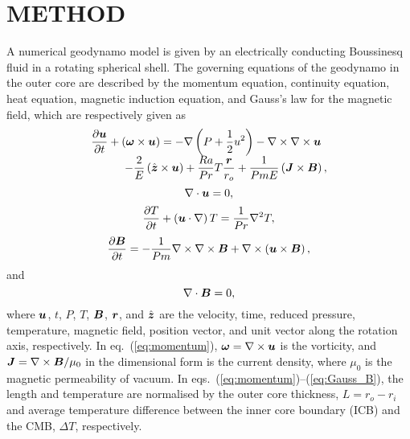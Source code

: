 \section{METHOD}

A numerical geodynamo model is given by an electrically conducting Boussinesq fluid in a rotating spherical shell. The governing equations of the geodynamo in the outer core are described by the momentum equation, continuity equation, heat equation, magnetic induction equation, and Gauss's law for the magnetic field, which are respectively given as
%
\begin{equation}
\begin{array}{l}
\displaystyle
\frac{\partial \mbox{\boldmath$u$}}{\partial t} + \left(\mbox{\boldmath$\omega$} \times \mbox{\boldmath$u$}\right)
 = - \nabla \left(P+\frac{1}{2}u^{2} \right) - \nabla \times \nabla \times \mbox{\boldmath$u$}
\\
\displaystyle
\hspace*{3em}
      - \frac{2}{E} \left(\hat{\mbox{\boldmath$z$}} \times \mbox{\boldmath$u$} \right)
  + \frac{Ra}{Pr} T \frac{\mbox{\boldmath$r$}}{r_{o}}
        + \frac{1}{Pm E} \left(\mbox{\boldmath$J$} \times \mbox{\boldmath$B$} \right),
\label{eq:momentum}
\end{array}
\end{equation}
%
\begin{equation}
\nabla \cdot \mbox{\boldmath$u$} = 0, 
\label{eq:conservation}
\end{equation}
%
\begin{equation}
\frac{\partial T}{\partial t} + \left(\mbox{\boldmath$u$} \cdot \nabla \right) T
 = \frac{1}{Pr} \nabla^{2} T,
\label{eq:heat}
\end{equation}
%
\begin{equation}
 \frac{\partial \mbox{\boldmath$B$}}{\partial t}
 = -\frac{1}{Pm}  \nabla \times \nabla \times \mbox{\boldmath$B$}
       + \nabla \times \left(\mbox{\boldmath$u$} \times \mbox{\boldmath$B$} \right),
\label{eq:induction}
\end{equation}
%
and
\begin{equation}
\nabla \cdot \mbox{\boldmath$B$} = 0,
\label{eq:Gauss_B}
\end{equation}
%
where $\mbox{\boldmath$u$}$, $t$, $P$, $T$, $\mbox{\boldmath$B$}$, $\mbox{\boldmath$r$}$, and $\hat{\mbox{\boldmath$z$}}$ are the velocity, time, reduced pressure, temperature, magnetic field, position vector, and unit vector along the rotation axis, respectively.
In eq.~(\ref{eq:momentum}), $\mbox{\boldmath$\omega$} = \nabla \times \mbox{\boldmath$u$}$ is the vorticity, and $\mbox{\boldmath$J$} = \nabla \times \mbox{\boldmath$B$} / \mu_0$ in the dimensional form is the current density, where $\mu_0$ is the magnetic permeability of vacuum.
In eqs.~(\ref{eq:momentum})--(\ref{eq:Gauss_B}), the length and temperature are normalised by the outer core thickness, $L = r_{o} - r_{i}$ and average temperature difference between the inner core boundary (ICB) and the CMB, $\Delta T$, respectively. 
